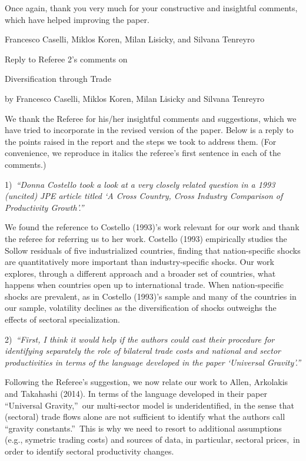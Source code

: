 \documentclass[12pt]{article}
\begin{document}
Once again, thank you very much for your constructive and insightful
comments, which have helped improving the paper.\medskip \medskip \bigskip

Francesco Caselli, Miklos Koren, Milan Lisicky, and Silvana Tenreyro

\thispagestyle{plain}\pagebreak

\begin{center}
\thispagestyle{plain}\setcounter{page}{1}Reply to Referee 2's comments on

{\Large Diversification through Trade}

by Francesco Caselli, Miklos Koren, Milan Lisicky and Silvana
Tenreyro\medskip

\bigskip
\end{center}

We thank the Referee for his/her insightful comments and suggestions, which
we have tried to incorporate in the revised version of the paper. Below is a
reply to the points raised in the report and the steps we took to address
them. (For convenience, we reproduce in italics the referee's first sentence
in each of the comments.)\bigskip

1)\textit{\ \textquotedblleft Donna Costello took a look at a very closely
related question in a 1993 (uncited) JPE article titled `A Cross Country,
Cross Industry Comparison of Productivity Growth'.\textquotedblright }

We found the reference to Costello (1993)'s work relevant for our work and
thank the referee for referring us to her work. Costello (1993) empirically
studies the Sollow residuals of five industrialized countries, finding that
nation-specific shocks are quantitatively more important than
industry-specific shocks. Our work explores, through a different approach
and a broader set of countries, what happens when countries open up to
international trade. When nation-specific shocks are prevalent, as in
Costello (1993)'s sample and many of the countries in our sample, volatility
declines as the diversification of shocks outweighs the effects of sectoral
specialization.\bigskip

2)\textit{\ \textquotedblleft First, I think it would help if the authors
could cast their procedure for identifying separately the role of bilateral
trade costs and national and sector productivities in terms of the language
developed in the paper `Universal Gravity'.\textquotedblright }

Following the Referee's suggestion, we now relate our work to Allen,
Arkolakis and Takahashi (2014). In terms of the language developed in their
paper \textquotedblleft Universal Gravity,\textquotedblright\ our
multi-sector model is underidentified, in the sense that (sectoral) trade
flows alone are not sufficient to identify what the authors call
\textquotedblleft gravity constants.\textquotedblright\ This is why we need
to resort to additional assumptions (e.g., symetric trading costs) and
sources of data, in particular, sectoral prices,\ in order to identify
sectoral productivity changes. \bigskip
\end{document}

